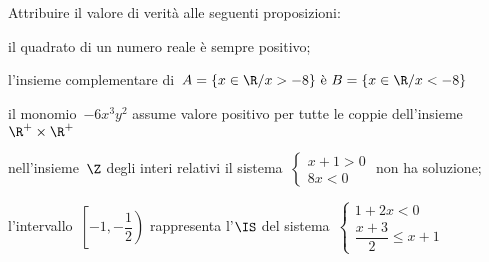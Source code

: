 \begin{esercizio}
 \label{ese:21.36}
 Attribuire il valore di verità alle seguenti proposizioni:

\begin{enumeratea}
\item il quadrato di un numero reale è sempre positivo;
\item l'insieme complementare di~\(A=\{x\in\R/x>-8\}\text{ è 
}B=\{x\in\R/x<-8\}\)
\item il monomio~\(-6x^{3}y^{2}\) assume valore positivo per tutte le coppie 
dell'insieme~\(\R^{+}\times\R^{+}\)
\item nell'insieme~\(\Z\) degli interi relativi il 
sistema~\(\left\{\begin{array}{l}x+1>0\\8x<0\end{array}\right.\) non ha 
soluzione;
\item l'intervallo~\(\left[-1,\left.-{\dfrac{1}{2}}\right)\right.\) 
rappresenta l'\(\IS\) del sistema~\(\left\{\begin{array}{l}1+2x<0 
\\\dfrac{x+3}{2}\le x+1\end{array}\right.\)
\end{enumeratea}
\end{esercizio}


